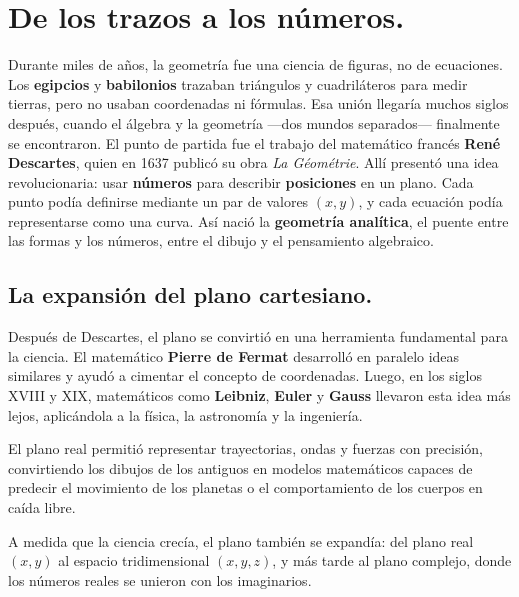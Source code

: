 
\vspace{0.5cm}

\vspace{1em}

\section*{De los trazos a los números.}

\begin{reseñaplana}
Durante miles de años, la geometría fue una ciencia de figuras, no de ecuaciones.  
Los \textbf{egipcios} y \textbf{babilonios} trazaban triángulos y cuadriláteros para medir tierras, 
pero no usaban coordenadas ni fórmulas.  
Esa unión llegaría muchos siglos después, cuando el álgebra y la geometría —dos mundos separados— finalmente se encontraron.
El punto de partida fue el trabajo del matemático francés \textbf{René Descartes}, quien en 1637 
publicó su obra \textit{La Géométrie}.  
Allí presentó una idea revolucionaria: usar \textbf{números} para describir \textbf{posiciones} en un plano.  
Cada punto podía definirse mediante un par de valores $(x, y)$, y cada ecuación podía representarse como una curva.  
Así nació la \textbf{geometría analítica}, el puente entre las formas y los números, entre el dibujo y el pensamiento algebraico.  
\end{reseñaplana}

\subsection*{La expansión del plano cartesiano.}
\begin{reseñaplana}
Después de Descartes, el plano se convirtió en una herramienta fundamental para la ciencia.  
El matemático \textbf{Pierre de Fermat} desarrolló en paralelo ideas similares y ayudó a cimentar el concepto de coordenadas.  
Luego, en los siglos XVIII y XIX, matemáticos como \textbf{Leibniz}, \textbf{Euler} y \textbf{Gauss} llevaron esta idea más lejos, 
aplicándola a la física, la astronomía y la ingeniería.  

El plano real permitió representar trayectorias, ondas y fuerzas con precisión, convirtiendo los dibujos de los antiguos en modelos 
matemáticos capaces de predecir el movimiento de los planetas o el comportamiento de los cuerpos en caída libre.  

A medida que la ciencia crecía, el plano también se expandía: del plano real $(x, y)$ al espacio tridimensional $(x, y, z)$, y más 
tarde al plano complejo, donde los números reales se unieron con los imaginarios.  
\end{reseñaplana}


